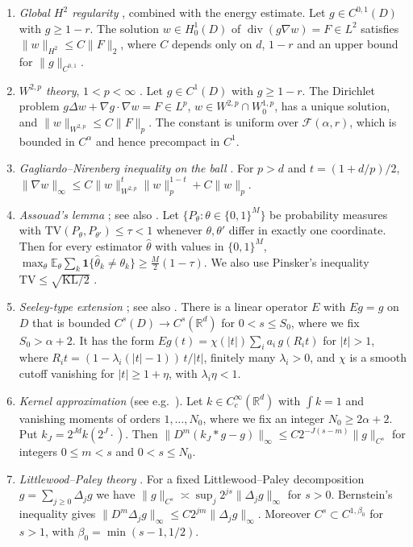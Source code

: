\documentclass[11pt]{article}
\theoremstyle{definition}
\theoremstyle{remark}
\newcommand{\R}{\mathbb R}
\newcommand{\E}{\mathbb E}
\newcommand{\one}{\mathbf 1}
\newcommand{\Fc}{\mathcal F}
\newcommand{\dv}{\operatorname{div}}
\newcommand{\KL}{\mathrm{KL}}
\newcommand{\TV}{\mathrm{TV}}
\begin{document}
\begin{enumerate}[label=\textbf{(\arabic*)},leftmargin=2.2em]
\item[\textbf{(E1)}] \emph{Global $H^2$ regularity} \cite[Theorem 8.12]{GT}, combined with the energy estimate. Let $g\in C^{0,1}(D)$ with $g\ge1-r$. The solution $w\in H^1_0(D)$ of $\dv(g\nabla w)=F\in L^2$ satisfies $\|w\|_{H^2}\le C\|F\|_2$, where $C$ depends only on $d$, $1-r$ and an upper bound for $\|g\|_{C^{0,1}}$.
\item[\textbf{(E2)}] \emph{$W^{2,p}$ theory}, $1<p<\infty$ \cite[Theorem 9.15, Lemma 9.17]{GT}. Let $g\in C^1(D)$ with $g\ge1-r$. The Dirichlet problem $g\Delta w+\nabla g\cdot\nabla w=F\in L^p$, $w\in W^{2,p}\cap W^{1,p}_0$, has a unique solution, and $\|w\|_{W^{2,p}}\le C\|F\|_p$. The constant is uniform over $\Fc(\alpha,r)$, which is bounded in $C^\alpha$ and hence precompact in $C^1$.
\item[\textbf{(GN)}] \emph{Gagliardo--Nirenberg inequality on the ball} \cite{Gag59,Nir59}. For $p>d$ and $t=(1+d/p)/2$,
$\|\nabla w\|_\infty\le C\|w\|^t_{W^{2,p}}\|w\|^{1-t}_p+C\|w\|_p$.
\item[\textbf{(As)}] \emph{Assouad's lemma} \cite{Ass83}; see also \cite[Ch.~2]{Tsy09}. Let $\{P_\theta:\theta\in\{0,1\}^M\}$ be probability measures with $\TV(P_\theta,P_{\theta'})\le\tau<1$ whenever $\theta,\theta'$ differ in exactly one coordinate. Then for every estimator $\hat\theta$ with values in $\{0,1\}^M$,
$\max_\theta\E_\theta\sum_k\one\{\hat\theta_k\neq\theta_k\}\ge\frac M2(1-\tau)$.
We also use Pinsker's inequality $\TV\le\sqrt{\KL/2}$ \cite[Ch.~2]{Tsy09}.
\item[\textbf{(C1)}] \emph{Seeley-type extension} \cite{See64}; see also \cite{Tri83}. There is a linear operator $E$ with $Eg=g$ on $D$ that is bounded $C^s(D)\to C^s(\R^d)$ for $0<s\le S_0$, where we fix $S_0>\alpha+2$. It has the form $Eg(t)=\chi(|t|)\sum_ia_i\,g(R_it)$ for $|t|>1$, where $R_it=(1-\lambda_i(|t|-1))\,t/|t|$, finitely many $\lambda_i>0$, and $\chi$ is a smooth cutoff vanishing for $|t|\ge1+\eta$, with $\lambda_i\eta<1$.
\item[\textbf{(C2)}] \emph{Kernel approximation} (see e.g.\ \cite{GN16}). Let $k\in C^\infty_c(\R^d)$ with $\int k=1$ and vanishing moments of orders $1,\dots,N_0$, where we fix an integer $N_0\ge2\alpha+2$. Put $k_J=2^{Jd}k(2^J\cdot)$. Then $\|D^m(k_J*g-g)\|_\infty\le C2^{-J(s-m)}\|g\|_{C^s}$ for integers $0\le m<s$ and $0<s\le N_0$.
\item[\textbf{(LP)}] \emph{Littlewood--Paley theory} \cite{Tri83,GN16}. For a fixed Littlewood--Paley decomposition $g=\sum_{j\ge0}\Delta_jg$ we have $\|g\|_{C^s}\asymp\sup_j2^{js}\|\Delta_jg\|_\infty$ for $s>0$. Bernstein's inequality gives $\|D^m\Delta_jg\|_\infty\le C2^{jm}\|\Delta_jg\|_\infty$. Moreover $C^s\subset C^{1,\beta_0}$ for $s>1$, with $\beta_0=\min(s-1,1/2)$. 

\end{enumerate}
\end{document}
